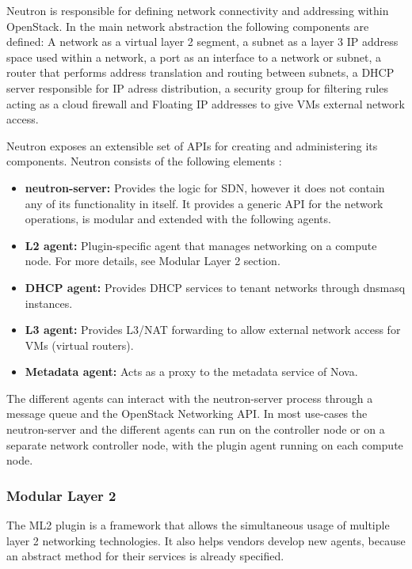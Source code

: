 Neutron is responsible for defining network connectivity and addressing within OpenStack. In the main network abstraction the following components are defined:
A network as a virtual layer 2 segment, a subnet as a layer 3 IP address space used within a network, a port as an interface to a network or subnet, a router that performs address translation and routing between subnets, a DHCP server responsible for IP adress distribution, a security group for filtering rules acting as a cloud firewall and Floating IP addresses to give VMs external network access.

Neutron exposes an extensible set of APIs for creating and administering its components. Neutron consists of the following elements \cite{openstack-training}:
\begin{itemize}
\item \textbf{neutron-server:} Provides the logic for SDN, however it does not contain any of its functionality in itself. It provides a generic API for the network operations, is modular and extended with the following agents.
\item \textbf{L2 agent:} Plugin-specific agent that manages networking on a compute node. For more details, see Modular Layer 2 section.
\item \textbf{DHCP agent:} Provides DHCP services to tenant networks through dnsmasq instances.
\item \textbf{L3 agent:} Provides L3/NAT forwarding to allow external network access for VMs (virtual routers).
\item \textbf{Metadata agent:} Acts as a proxy to the metadata service of Nova.
\end{itemize}

The different agents can interact with the neutron-server process through a message queue and the OpenStack Networking API. In most use-cases the neutron-server and the different agents can run on the controller node or on a separate network controller node, with the plugin agent running on each compute node.


\subsubsection{Modular Layer 2}

The ML2 plugin is a framework that allows the simultaneous usage of multiple layer 2 networking technologies. It also helps vendors develop new agents, because an abstract method for their services is already specified.

